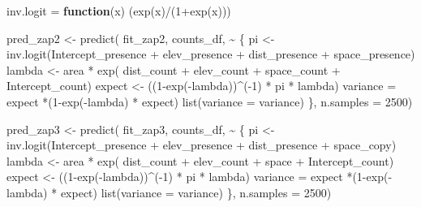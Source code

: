 \documentclass[
  letterpaper,
  DIV=11,
  numbers=noendperiod]{scrartcl}
\newenvironment{Shaded}{\begin{snugshade}}{\end{snugshade}}
\newcommand{\AttributeTok}[1]{\textcolor[rgb]{0.40,0.45,0.13}{#1}}
\newcommand{\ControlFlowTok}[1]{\textcolor[rgb]{0.00,0.23,0.31}{\textbf{#1}}}
\newcommand{\DecValTok}[1]{\textcolor[rgb]{0.68,0.00,0.00}{#1}}
\newcommand{\FunctionTok}[1]{\textcolor[rgb]{0.28,0.35,0.67}{#1}}
\newcommand{\NormalTok}[1]{\textcolor[rgb]{0.00,0.23,0.31}{#1}}
\newcommand{\OtherTok}[1]{\textcolor[rgb]{0.00,0.23,0.31}{#1}}
\newcommand{\SpecialCharTok}[1]{\textcolor[rgb]{0.37,0.37,0.37}{#1}}
\begin{document}
\begin{tcolorbox}
\begin{Shaded}
\begin{Highlighting}[]
\NormalTok{inv.logit }\OtherTok{=} \ControlFlowTok{function}\NormalTok{(x) (}\FunctionTok{exp}\NormalTok{(x)}\SpecialCharTok{/}\NormalTok{(}\DecValTok{1}\SpecialCharTok{+}\FunctionTok{exp}\NormalTok{(x)))}

\NormalTok{pred\_zap2 }\OtherTok{\textless{}{-}} \FunctionTok{predict}\NormalTok{( fit\_zap2, counts\_df,}
  \SpecialCharTok{\textasciitilde{}}\NormalTok{ \{}
\NormalTok{    pi }\OtherTok{\textless{}{-}} \FunctionTok{inv.logit}\NormalTok{(Intercept\_presence }\SpecialCharTok{+}\NormalTok{ elev\_presence }\SpecialCharTok{+}\NormalTok{ dist\_presence }\SpecialCharTok{+}\NormalTok{ space\_presence)}
\NormalTok{    lambda }\OtherTok{\textless{}{-}}\NormalTok{ area }\SpecialCharTok{*} \FunctionTok{exp}\NormalTok{( dist\_count }\SpecialCharTok{+}\NormalTok{ elev\_count }\SpecialCharTok{+}\NormalTok{ space\_count }\SpecialCharTok{+}\NormalTok{ Intercept\_count)}
\NormalTok{    expect }\OtherTok{\textless{}{-}}\NormalTok{ ((}\DecValTok{1}\SpecialCharTok{{-}}\FunctionTok{exp}\NormalTok{(}\SpecialCharTok{{-}}\NormalTok{lambda))}\SpecialCharTok{\^{}}\NormalTok{(}\SpecialCharTok{{-}}\DecValTok{1}\NormalTok{) }\SpecialCharTok{*}\NormalTok{ pi }\SpecialCharTok{*}\NormalTok{ lambda)}
\NormalTok{    variance }\OtherTok{=}\NormalTok{ expect }\SpecialCharTok{*}\NormalTok{(}\DecValTok{1}\SpecialCharTok{{-}}\FunctionTok{exp}\NormalTok{(}\SpecialCharTok{{-}}\NormalTok{lambda) }\SpecialCharTok{*}\NormalTok{ expect)}
    \FunctionTok{list}\NormalTok{(}\AttributeTok{variance =}\NormalTok{ variance)}
\NormalTok{  \},}
  \AttributeTok{n.samples =} \DecValTok{2500}\NormalTok{)}

\NormalTok{pred\_zap3 }\OtherTok{\textless{}{-}} \FunctionTok{predict}\NormalTok{( fit\_zap3, counts\_df,}
  \SpecialCharTok{\textasciitilde{}}\NormalTok{ \{}
\NormalTok{    pi }\OtherTok{\textless{}{-}} \FunctionTok{inv.logit}\NormalTok{(Intercept\_presence }\SpecialCharTok{+}\NormalTok{ elev\_presence }\SpecialCharTok{+}\NormalTok{ dist\_presence }\SpecialCharTok{+}\NormalTok{ space\_copy)}
\NormalTok{    lambda }\OtherTok{\textless{}{-}}\NormalTok{ area }\SpecialCharTok{*} \FunctionTok{exp}\NormalTok{( dist\_count }\SpecialCharTok{+}\NormalTok{ elev\_count }\SpecialCharTok{+}\NormalTok{ space }\SpecialCharTok{+}\NormalTok{ Intercept\_count)}
\NormalTok{    expect }\OtherTok{\textless{}{-}}\NormalTok{ ((}\DecValTok{1}\SpecialCharTok{{-}}\FunctionTok{exp}\NormalTok{(}\SpecialCharTok{{-}}\NormalTok{lambda))}\SpecialCharTok{\^{}}\NormalTok{(}\SpecialCharTok{{-}}\DecValTok{1}\NormalTok{) }\SpecialCharTok{*}\NormalTok{ pi }\SpecialCharTok{*}\NormalTok{ lambda)}
\NormalTok{    variance }\OtherTok{=}\NormalTok{ expect }\SpecialCharTok{*}\NormalTok{(}\DecValTok{1}\SpecialCharTok{{-}}\FunctionTok{exp}\NormalTok{(}\SpecialCharTok{{-}}\NormalTok{lambda) }\SpecialCharTok{*}\NormalTok{ expect)}
    \FunctionTok{list}\NormalTok{(}\AttributeTok{variance =}\NormalTok{ variance)}
\NormalTok{  \},}
  \AttributeTok{n.samples =} \DecValTok{2500}\NormalTok{)}





\end{Highlighting}
\end{Shaded}
\end{tcolorbox}
\end{document}
